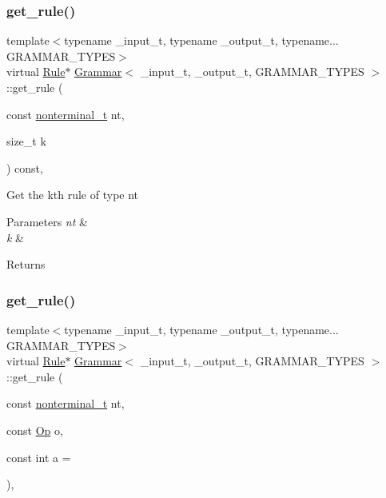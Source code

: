 \subsubsection{\texorpdfstring{get\+\_\+rule()}{get\_rule()}\hspace{0.1cm}{\footnotesize\ttfamily [1/5]}}
{\footnotesize\ttfamily template$<$typename \+\_\+input\+\_\+t, typename \+\_\+output\+\_\+t, typename... G\+R\+A\+M\+M\+A\+R\+\_\+\+T\+Y\+P\+ES$>$ \\
virtual \hyperlink{class_rule}{Rule}$\ast$ \hyperlink{class_grammar}{Grammar}$<$ \+\_\+input\+\_\+t, \+\_\+output\+\_\+t, G\+R\+A\+M\+M\+A\+R\+\_\+\+T\+Y\+P\+ES $>$\+::get\+\_\+rule (\begin{DoxyParamCaption}\item[{const \hyperlink{_nonterminal_8h_a1c5bfe9b903f69c83bbde5da7035fef3}{nonterminal\+\_\+t}}]{nt,  }\item[{size\+\_\+t}]{k }\end{DoxyParamCaption}) const\hspace{0.3cm}{\ttfamily [inline]}, {\ttfamily [virtual]}}

Get the k\textquotesingle{}th rule of type nt 
\begin{DoxyParams}{Parameters}
{\em nt} & \\
\hline
{\em k} & \\
\hline
\end{DoxyParams}
\begin{DoxyReturn}{Returns}

\end{DoxyReturn}
\mbox{\label{class_grammar_a92123503b80e2c10f0d9b766baf6304f}} 
\subsubsection{\texorpdfstring{get\+\_\+rule()}{get\_rule()}\hspace{0.1cm}{\footnotesize\ttfamily [2/5]}}
{\footnotesize\ttfamily template$<$typename \+\_\+input\+\_\+t, typename \+\_\+output\+\_\+t, typename... G\+R\+A\+M\+M\+A\+R\+\_\+\+T\+Y\+P\+ES$>$ \\
virtual \hyperlink{class_rule}{Rule}$\ast$ \hyperlink{class_grammar}{Grammar}$<$ \+\_\+input\+\_\+t, \+\_\+output\+\_\+t, G\+R\+A\+M\+M\+A\+R\+\_\+\+T\+Y\+P\+ES $>$\+::get\+\_\+rule (\begin{DoxyParamCaption}\item[{const \hyperlink{_nonterminal_8h_a1c5bfe9b903f69c83bbde5da7035fef3}{nonterminal\+\_\+t}}]{nt,  }\item[{const \hyperlink{_ops_8h_a588e6b56097e045c733b60d25c4d45ab}{Op}}]{o,  }\item[{const int}]{a = {} }\end{DoxyParamCaption})\hspace{0.3cm}{\ttfamily [inline]}, {\ttfamily [virtual]}}

